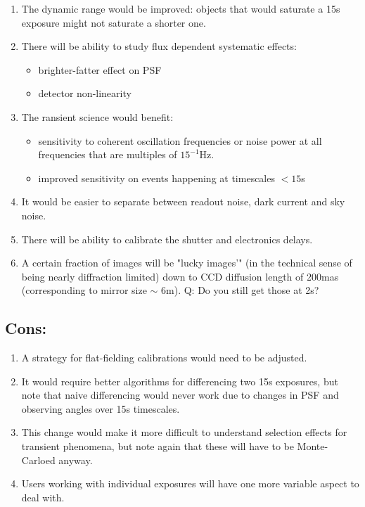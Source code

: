\documentclass[12pt, a4paper]{article}
\begin{document}
\begin{enumerate}
\item The  dynamic range would be improved: objects that would saturate a 15s
  exposure might not saturate a shorter one.

\item There will be ability to study flux dependent systematic effects:
  \begin{itemize}
  \item brighter-fatter effect on PSF
  \item detector non-linearity
  \end{itemize}

\item The ransient science would benefit:
  \begin{itemize}
  \item sensitivity to coherent oscillation frequencies or noise power at all
    frequencies that are multiples  of $15^{-1}$Hz.
  \item improved sensitivity on events happening at timescales $<15$s 
  \end{itemize}

\item It would be easier to separate between readout noise, dark
  current and sky noise.

\item There will be ability to calibrate the shutter and electronics delays.

\item A certain fraction of images will be "lucky images'" (in the
  technical sense of being nearly diffraction limited) down to
  CCD diffusion length of 200mas (corresponding to mirror size $\sim$
  6m). Q: Do you still get those at 2s?

\end{enumerate}

\subsection*{Cons:}

\begin{enumerate}

\item A strategy for flat-fielding calibrations would need to be
  adjusted.


\item It would require better algorithms for differencing two 15s
  exposures, but note that naive differencing would never work due to
  changes in PSF and observing angles over 15s timescales.

\item This change would make it more difficult to understand selection
  effects for transient phenomena, but note again that these will have
  to be Monte-Carloed anyway.

\item Users working with individual exposures will have one more
  variable aspect to deal with.

\end{enumerate}
\end{document}
